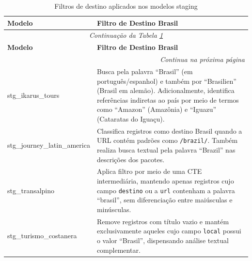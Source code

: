 \small
\renewcommand{\arraystretch}{1.2}

\begin{longtable}{|p{3.5cm}|p{10cm}|}

\caption{Filtros de destino aplicados nos modelos staging}
\label{tab:staging_filtros} \\

\hline
\textbf{Modelo} & \textbf{Filtro de Destino Brasil} \\ \hline
\endfirsthead

\multicolumn{2}{c}{\textit{Continuação da Tabela \ref{tab:staging_filtros}}} \\ \hline
\textbf{Modelo} & \textbf{Filtro de Destino Brasil} \\ \hline
\endhead

\hline
\multicolumn{2}{r}{\textit{Continua na próxima página}} \\
\endfoot

\hline
\endlastfoot

stg\_ikarus\_tours &
Busca pela palavra ``Brasil'' (em português/espanhol) e também por ``Brasilien'' (Brasil em alemão). Adicionalmente, identifica referências indiretas ao país por meio de termos como ``Amazon'' (Amazônia) e ``Iguazu'' (Cataratas do Iguaçu). \\ \hline

stg\_journey\_latin\_america &
Classifica registros como destino Brasil quando a URL contém padrões como \texttt{/brazil/}. Também realiza busca textual pela palavra ``Brazil'' nas descrições dos pacotes. \\ \hline

stg\_transalpino &
Aplica filtro por meio de uma CTE intermediária, mantendo apenas registros cujo campo \texttt{destino} ou a \texttt{url} contenham a palavra ``brasil'', sem diferenciação entre maiúsculas e minúsculas. \\ \hline

stg\_turismo\_costanera &
Remove registros com título vazio e mantém exclusivamente aqueles cujo campo \texttt{local} possui o valor ``Brasil'', dispensando análise textual complementar. \\

\end{longtable}